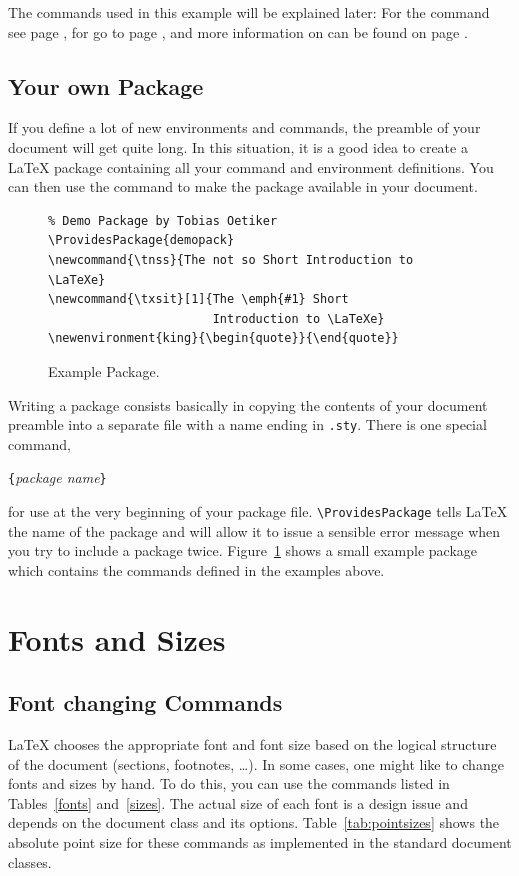 The commands used in this example will be explained later: For the
 command see page \pageref{sec:rule}, for  go to
page \pageref{cmd:stretch}, and more information on  can be
found on page \pageref{sec:hspace}.

\subsection{Your own Package}

If you define a lot of new environments and commands, the preamble of
your document will get quite long. In this situation, it is a good
idea to create a \LaTeX{} package containing all your command and
environment definitions. You can then use the 
command to make the package available in your document.

\begin{figure}[!htbp]
\begin{lined}{\textwidth}
\begin{verbatim}
% Demo Package by Tobias Oetiker
\ProvidesPackage{demopack}
\newcommand{\tnss}{The not so Short Introduction to \LaTeXe}
\newcommand{\txsit}[1]{The \emph{#1} Short 
                       Introduction to \LaTeXe}
\newenvironment{king}{\begin{quote}}{\end{quote}}
\end{verbatim}
\end{lined}
\caption{Example Package.} \label{package}
\end{figure}

Writing a package consists  basically in copying the contents of
your document preamble into a separate file with a name ending in
\texttt{.sty}. There is one special command,
\begin{command}
\verb|{|\emph{package name}\verb|}|
\end{command}
\noindent for use at the very beginning of your package
file. \verb|\ProvidesPackage| tells \LaTeX{} the name of the package
and will allow it to issue a sensible error message when you try to
include a package twice. Figure~\ref{package} shows a small example
package which contains the commands defined in the examples above.

\section{Fonts and Sizes}

\subsection{Font changing Commands}
 \LaTeX{} chooses the appropriate font
and font size based on the logical structure of the document
(sections, footnotes, \ldots).  In some cases, one might like to change
fonts and sizes by hand. To do this, you can use the commands listed in
Tables~\ref{fonts} and~\ref{sizes}. The actual size of each font
is a design issue and depends on the document class and its options. 
Table~\ref{tab:pointsizes} shows the absolute point size for these
commands as implemented in the standard document classes.

